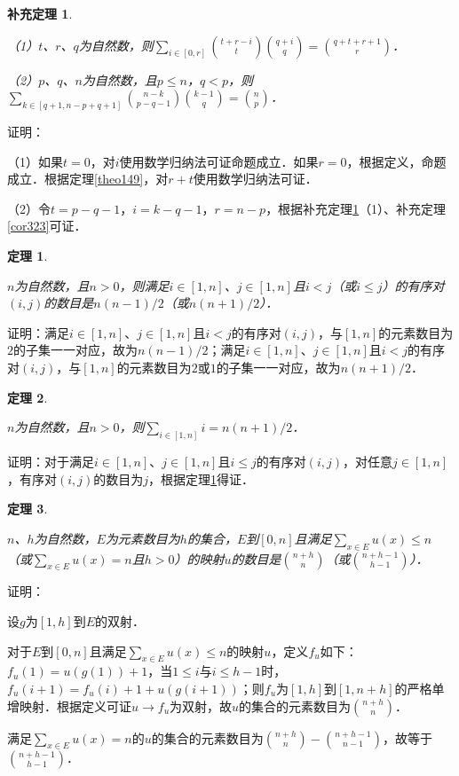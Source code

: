 \documentclass[12pt, a4paper, oneside]{book}
\newtheorem{theo}{定理}
\newtheorem{cor}{补充定理}
\begin{document}
			\begin{cor}\label{cor328}
				\hfill\par
				（1）$t$、$r$、$q$为自然数，则$\sum\limits_{i\in [0, r]}\binom{t+r-i}{t}\binom{q+i}{q}=\binom{q+t+r+1}{r}$．
				\par
				（2）$p$、$q$、$n$为自然数，且$p\leq n$，$q<p$，则$\sum\limits_{k\in [q+1, n-p+q+1]}\binom{n-k}{p-q-1}\binom{k-1}{q}=\binom{n}{p}$．
			\end{cor}
			证明：
			\par
			（1）如果$t=0$，对$i$使用数学归纳法可证命题成立．如果$r=0$，根据定义，命题成立．根据定理\ref{theo149}，对$r+t$使用数学归纳法可证．
			\par
			（2）令$t=p-q-1$，$i=k-q-1$，$r=n-p$，根据补充定理\ref{cor328}（1）、补充定理\ref{cor323}可证．
			
			\begin{theo}\label{theo150}
				\hfill\par
				$n$为自然数，且$n>0$，则满足$i\in [1, n]$、$j\in [1, n]$且$i<j$（或$i\leq j$）的有序对$(i, j)$的数目是$n(n-1)/2$（或$n(n+1)/2$）．
			\end{theo}
			证明：满足$i\in [1, n]$、$j\in [1, n]$且$i<j$的有序对$(i, j)$，与$[1, n]$的元素数目为$2$的子集一一对应，故为$n(n-1)/2$；满足$i\in [1, n]$、$j\in [1, n]$且$i<j$的有序对$(i, j)$，与$[1, n]$的元素数目为$2$或$1$的子集一一对应，故为$n(n+1)/2$．
			
			\begin{theo}\label{theo151}
				\hfill\par
				$n$为自然数，且$n>0$，则$\sum\limits_{i\in [1, n]}i=n(n+1)/2$．
			\end{theo}
			证明：对于满足$i\in [1, n]$、$j\in [1, n]$且$i\leq j$的有序对$(i, j)$，对任意$j\in [1, n]$，有序对$(i, j)$的数目为$j$，根据定理\ref{theo150}得证．
			
			\begin{theo}\label{theo152}
				\hfill\par
				$n$、$h$为自然数，$E$为元素数目为$h$的集合，$E$到$[0, n]$且满足$\sum\limits_{x\in E}u(x)\leq n$（或$\sum\limits_{x\in E}u(x)=n$且$h>0$）的映射$u$的数目是$\binom{n+h}{n}$（或$\binom{n+h-1}{h-1}$）．
			\end{theo}
			证明：
			\par
			设$g$为$[1, h]$到$E$的双射．
			\par
			对于$E$到$[0, n]$且满足$\sum\limits_{x\in E}u(x)\leq n$的映射$u$，定义$f_u$如下：$f_u(1)=u(g(1))+1$，当$1\leq i\text{与}i\leq h-1$时，$f_u(i+1)=f_u(i)+1+u(g(i+1))$；则$f_u$为$[1, h]$到$[1, n+h]$的严格单增映射．根据定义可证$u\to f_u$为双射，故$u$的集合的元素数目为$\binom{n+h}{n}$．
			\par
			满足$\sum\limits_{x\in E}u(x)=n$的$u$的集合的元素数目为$\binom{n+h}{n}-\binom{n+h-1}{n-1}$，故等于$\binom{n+h-1}{h-1}$．
			
\end{document}
